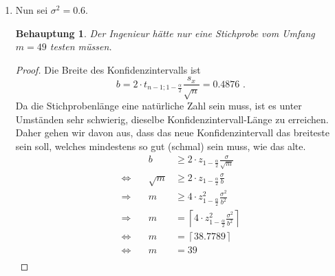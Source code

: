\documentclass[a4paper]{scrartcl}
\newtheorem*{behaupt}{Behauptung}
\newcommand{\gdw}{\Leftrightarrow}
\def \blattnr {8}
\begin{document}
\begin{enumerate}[label=\bfseries \blattnr.\arabic*]
\begin{enumerate}
            \item 
                Nun sei $\sigma^2 = \num{0.6}$.
                \begin{behaupt}
                    Der Ingenieur hätte nur eine Stichprobe vom Umfang $m = 49$
                    testen müssen.
                \end{behaupt}
                \begin{proof}
                    Die Breite des Konfidenzintervalls ist
                    \begin{equation*}
                        b = 2 \cdot t_{n-1; 1-\frac{\alpha}{2}}\frac{s_x}{\sqrt{n}}
                        = \num{0.4876}
                        \text{ .}
                    \end{equation*}
                    Da die Stichprobenlänge eine natürliche Zahl sein muss, ist
                    es unter Umständen sehr schwierig, dieselbe
                    Konfidenzintervall-Länge zu erreichen.
                    Daher gehen wir davon aus, dass das neue Konfidenzintervall
                    das breiteste sein soll, welches mindestens so gut (schmal)
                    sein muss, wie das alte.
                    \begin{equation*}
                        \begin{alignedat}{2}
                            && b 
                            &\geq 2 \cdot z_{1-\frac{\alpha}{2}}
                            \frac{\sigma}{\sqrt{m}} \\
                            \gdw\ && \sqrt{m}
                            &\geq 2 \cdot z_{1-\frac{\alpha}{2}}
                            \frac{\sigma}{b} \\
                            \Rightarrow\ && m
                            &\geq 4 \cdot z_{1-\frac{\alpha}{2}}^2
                            \frac{\sigma^2}{b^2} \\
                            \Rightarrow\ && m
                            &= \left\lceil 4 \cdot z_{1-\frac{\alpha}{2}}^2
                            \frac{\sigma^2}{b^2} \right\rceil \\
                            \gdw\ && m
                            &= \left\lceil \num{38,7789} \right\rceil \\
                            \gdw\ && m &= 39 \\
                        \end{alignedat}
                    \end{equation*}
                \end{proof}


\end{enumerate}
\end{enumerate}
\end{document}
